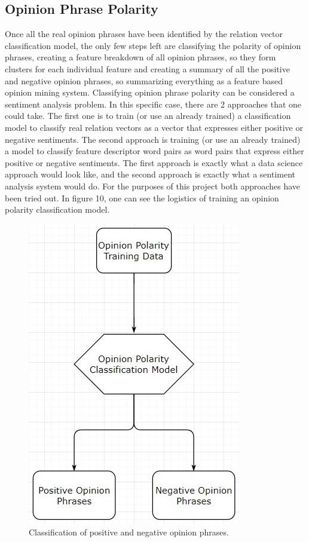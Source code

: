 \documentclass{sig-alternate}
\begin{document}
\subsection{Opinion Phrase Polarity}
Once all the real opinion phrases have been identified by the relation vector classification model, the only few steps left are classifying the polarity of opinion phrases, creating a feature breakdown of all opinion phrases, so they form clusters for each individual feature and creating a summary of all the positive and negative opinion phrases, so summarizing everything as a feature based opinion mining system.
Classifying opinion phrase polarity can be considered a sentiment analysis problem. In this specific case, there are 2 approaches that one could take. The first one is to train (or use an already trained) a classification model to classify real relation vectors as a vector that expresses either positive or negative sentiments. The second approach is training (or use an already trained) a model to classify feature descriptor word pairs as word pairs that express either positive or negative sentiments. The first approach is exactly what a data science approach would look like, and the second approach is exactly what a sentiment analysis system would do. For the purposes of this project both approaches have been tried out. In figure 10, one can see the logistics of training an opinion polarity classification model.

\begin{figure}
\centering
\includegraphics[scale=0.60]{images/opinion_classifier.JPG}
\caption{Classification of positive and negative opinion phrases.}
\end{figure}
\end{document}
